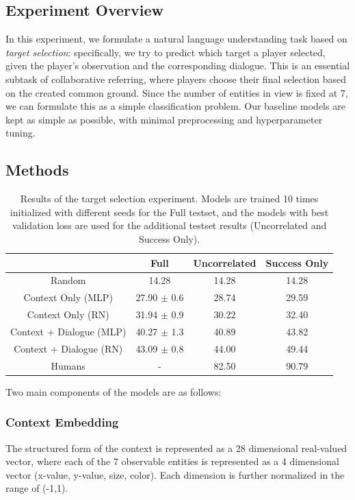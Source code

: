 \documentclass[letterpaper]{article} %
\begin{document}
\subsection{Experiment Overview}

In this experiment, we formulate a natural language understanding task based on \textit{target selection}: specifically, we try to predict which target a player selected, given the player's observation and the corresponding dialogue. This is an essential subtask of collaborative referring, where players choose their final selection based on the created common ground. Since the number of entities in view is fixed at 7, we can formulate this as a simple classification problem. Our baseline models are kept as simple as possible, with minimal preprocessing and hyperparameter tuning.

\subsection{Methods}

\begin{table}[htb!]
\centering \small
\begin{tabular}{c|ccc}
\toprule
 & Full & Uncorrelated & Success Only \\
\midrule
Random & 14.28 & 14.28 & 14.28 \\
\midrule
Context Only (MLP) & 27.90 $\pm$ 0.6 & 28.74 & 29.59 \\
Context Only (RN) & 31.94 $\pm$ 0.9 & 30.22 & 32.40 \\
Context + Dialogue (MLP) & 40.27 $\pm$ 1.3 & 40.89 & 43.82 \\
Context + Dialogue (RN) & 43.09 $\pm$ 0.8 & 44.00 & 49.44 \\
\midrule
Humans & - & 82.50 & 90.79 \\
\bottomrule
\end{tabular}
\caption{\label{selection_experiment}
Results of the target selection experiment. Models are trained 10 times initialized with different seeds for the Full testset, and the models with best validation loss are used for the additional testset results (Uncorrelated and Success Only).
}
\end{table}

Two main components of the models are as follows:

\subsubsection{Context Embedding}
The structured form of the context is represented as a 28 dimensional real-valued vector, where each of the 7 observable entities is represented as a 4 dimensional vector (x-value, y-value, size, color). Each dimension is further normalized in the range of (-1,1).
\end{document}
